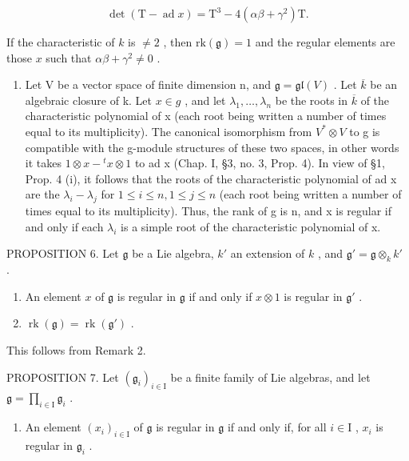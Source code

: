 \[
\det (\mathrm{T} - \operatorname{ad} x) = \mathrm{T} ^ {3} - 4 (\alpha \beta + \gamma^ {2}) \mathrm{T}.
\]

If the characteristic of \(k\) is \(\neq 2\) , then \(\mathrm{rk}(\mathfrak{g}) = 1\) and the regular elements are those \(x\) such that \(\alpha \beta + \gamma^2 \neq 0\) .

\begin{enumerate}
\def\labelenumi{\arabic{enumi})}
\setcounter{enumi}{2}
\tightlist
\item
  Let V be a vector space of finite dimension n, and \(\mathfrak{g} = \mathfrak{gl}(V)\) . Let \(\overline{k}\) be an algebraic closure of k. Let \(x \in g\) , and let \(\lambda_{1}, \ldots, \lambda_{n}\) be the roots in \(\overline{k}\) of the characteristic polynomial of x (each root being written a number of times equal to its multiplicity). The canonical isomorphism from \(V^{*} \otimes V\) to g is compatible with the g-module structures of these two spaces, in other words it takes \(1 \otimes x - {}^{t}x \otimes 1\) to ad x (Chap. I, §3, no. 3, Prop. 4). In view of §1, Prop. 4 (i), it follows that the roots of the characteristic polynomial of ad x are the \(\lambda_{i} - \lambda_{j}\) for \(1 \leq i \leq n, 1 \leq j \leq n\) (each root being written a number of times equal to its multiplicity). Thus, the rank of g is n, and x is regular if and only if each \(\lambda_{i}\) is a simple root of the characteristic polynomial of x.
\end{enumerate}

PROPOSITION 6. Let \(\mathfrak{g}\) be a Lie algebra, \(k'\) an extension of \(k\) , and \(\mathfrak{g}' = \mathfrak{g} \otimes_k k'\) .

\begin{enumerate}
\def\labelenumi{(\roman{enumi})}
\tightlist
\item
  An element \(x\) of \(\mathfrak{g}\) is regular in \(\mathfrak{g}\) if and only if \(x \otimes 1\) is regular in \(\mathfrak{g}'\) .\\
\item
  \(\operatorname{rk}(\mathfrak{g}) = \operatorname{rk}(\mathfrak{g}')\) .
\end{enumerate}

This follows from Remark 2.

PROPOSITION 7. Let \((\mathfrak{g}_i)_{i\in \mathrm{I}}\) be a finite family of Lie algebras, and let \(\mathfrak{g} = \prod_{i\in \mathrm{I}}\mathfrak{g}_i\) .

\begin{enumerate}
\def\labelenumi{(\roman{enumi})}
\tightlist
\item
  An element \((x_{i})_{i\in \mathrm{I}}\) of \(\mathfrak{g}\) is regular in \(\mathfrak{g}\) if and only if, for all \(i\in \mathrm{I}\) , \(x_{i}\) is regular in \(\mathfrak{g}_i\) .
\end{enumerate}

